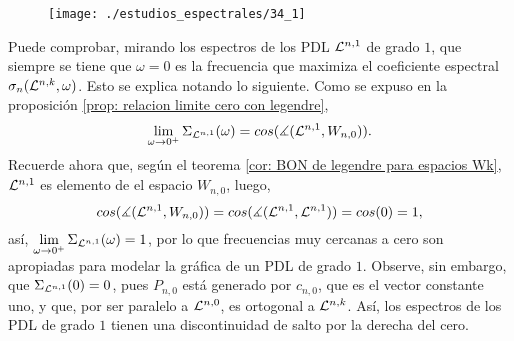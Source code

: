 \begin{figure}[H]
	\sidecaption{
	}
	\centering
	\texttt{[image: ./estudios\_espectrales/34\_1]} 
\end{figure}	

Puede comprobar, mirando los espectros
de los PDL $\mathcal{L}^{n,1}$ de grado $1$,
que siempre se tiene que $ \omega = 0$ es la frecuencia
que maximiza el coeficiente espectral
$\sigma_{n}(\mathcal{L}^{n,k}, \omega)$.
Esto se explica notando lo siguiente.
Como se expuso en la proposición
\ref{prop: relacion limite cero con legendre}, 
\[
\lim\limits_{\omega\rightarrow 0^{+}}{\Sigma_{\mathcal{L}^{n,1}}(\omega)}
= cos(\measuredangle(\mathcal{L}^{n,1}, W_{n,0})).
\]
Recuerde ahora que, según el teorema
\ref{cor: BON de legendre para espacios Wk},
$\mathcal{L}^{n,1}$ es elemento de el espacio $W_{n,0}$, luego,
\[
cos(\measuredangle(\mathcal{L}^{n,1}, W_{n,0})) = 
cos(\measuredangle(\mathcal{L}^{n,1}, \mathcal{L}^{n,1}))
= cos(0) = 1,
\]
así, 
$\lim\limits_{\omega\rightarrow 0^{+}}{\Sigma_{\mathcal{L}^{n,1}}(\omega)} =1$, por lo 
que frecuencias muy cercanas a cero son apropiadas
para modelar la gráfica de un PDL de grado $1$.
Observe, sin embargo, que 
$\Sigma_{\mathcal{L}^{n,1}}(0)=0$, pues
$P_{n, 0}$ está generado por
$c_{n,0}$, que es el vector constante uno, y que,
por ser paralelo a $\mathcal{L}^{n,0}$,
es ortogonal a $\mathcal{L}^{n,k}$. Así, los espectros
de los PDL de grado $1$ tienen una discontinuidad de salto
por la derecha del cero. 

\begin{comment}
Esto se explica observando que
lo que estamos haciendo con este análisis espectral
es aproximar las gráficas de señales con sinusoides, que son
funciones diferenciables en todo punto
(hecho que puede
puede interpretarse
como que los ``alrededores
cercanos'' de cualquier
punto de la gráfica de un sinusoide son 
parecidos a una recta), luego, tiene sentido que  
el análisis espectral de mayor peso a las 
frecuencias cercanas a cero
para modelar la gráfica de $\cali{L}^{n,k}$
que, según el teorema 
\ref{cor: BON de legendre para espacios Wk}, está contenida
en una recta. Observe que 
$\sigma_{n}(\cali{L}^{n,k}, 0)$ es cero, pues
$P_{n, 0}$ está generado por
$c_{n,0}$, que es el vector constante uno, y que,
por ser paralelo a $\cali{L}^{n,0}$,
es ortogonal a $\cali{L}^{n,k}$. Así, los espectros
de los PDL de grado $1$ tienen una discontinuidad de salto
por la derecha del cero. 
\end{comment}


